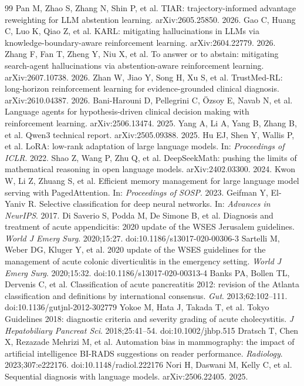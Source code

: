 \documentclass[11pt]{article}
\begin{document}
\begin{thebibliography}{99}
 Pan M, Zhao S, Zhang N, Shin P, et al. TIAR: trajectory-informed advantage reweighting for LLM abstention learning. arXiv:2605.25850. 2026.
 Gao C, Huang C, Luo K, Qiao Z, et al. KARL: mitigating hallucinations in LLMs via knowledge-boundary-aware reinforcement learning. arXiv:2604.22779. 2026.
 Zhang F, Fan T, Zheng Y, Niu X, et al. To answer or to abstain: mitigating search-agent hallucinations via abstention-aware reinforcement learning. arXiv:2607.10738. 2026.
 Zhan W, Jiao Y, Song H, Xu S, et al. TrustMed-RL: long-horizon reinforcement learning for evidence-grounded clinical diagnosis. arXiv:2610.04387. 2026.
 Bani-Harouni D, Pellegrini C, Özsoy E, Navab N, et al. Language agents for hypothesis-driven clinical decision making with reinforcement learning. arXiv:2506.13474. 2025.
 Yang A, Li A, Yang B, Zhang B, et al. Qwen3 technical report. arXiv:2505.09388. 2025.
 Hu EJ, Shen Y, Wallis P, et al. LoRA: low-rank adaptation of large language models. In: \textit{Proceedings of ICLR}. 2022.
 Shao Z, Wang P, Zhu Q, et al. DeepSeekMath: pushing the limits of mathematical reasoning in open language models. arXiv:2402.03300. 2024.
 Kwon W, Li Z, Zhuang S, et al. Efficient memory management for large language model serving with PagedAttention. In: \textit{Proceedings of SOSP}. 2023.
 Geifman Y, El-Yaniv R. Selective classification for deep neural networks. In: \textit{Advances in NeurIPS}. 2017.
 Di Saverio S, Podda M, De Simone B, et al. Diagnosis and treatment of acute appendicitis: 2020 update of the WSES Jerusalem guidelines. \textit{World J Emerg Surg}. 2020;15:27. doi:10.1186/s13017-020-00306-3
 Sartelli M, Weber DG, Kluger Y, et al. 2020 update of the WSES guidelines for the management of acute colonic diverticulitis in the emergency setting. \textit{World J Emerg Surg}. 2020;15:32. doi:10.1186/s13017-020-00313-4
 Banks PA, Bollen TL, Dervenis C, et al. Classification of acute pancreatitis 2012: revision of the Atlanta classification and definitions by international consensus. \textit{Gut}. 2013;62:102--111. doi:10.1136/gutjnl-2012-302779
 Yokoe M, Hata J, Takada T, et al. Tokyo Guidelines 2018: diagnostic criteria and severity grading of acute cholecystitis. \textit{J Hepatobiliary Pancreat Sci}. 2018;25:41--54. doi:10.1002/jhbp.515
 Dratsch T, Chen X, Rezazade Mehrizi M, et al. Automation bias in mammography: the impact of artificial intelligence BI-RADS suggestions on reader performance. \textit{Radiology}. 2023;307:e222176. doi:10.1148/radiol.222176
 Nori H, Daswani M, Kelly C, et al. Sequential diagnosis with language models. arXiv:2506.22405. 2025.
\end{thebibliography}
\end{document}
